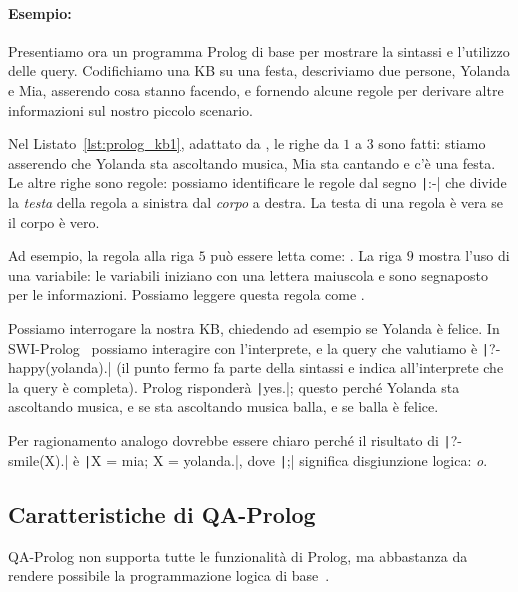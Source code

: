 \paragraph{Esempio:} Presentiamo ora un programma Prolog di base per mostrare la sintassi e l'utilizzo delle query. Codifichiamo una KB su una festa, descriviamo due persone, Yolanda e Mia, asserendo cosa stanno facendo, e fornendo alcune regole per derivare altre informazioni sul nostro piccolo scenario.
\begin{listingenv}[h]
	\caption{KB di base}
	\label{lst:prolog_kb1}
\end{listingenv}

Nel Listato~\ref{lst:prolog_kb1}, adattato da \cite{learn_prolog_now_online}, le righe da $1$ a $3$ sono fatti: stiamo asserendo che Yolanda sta ascoltando musica, Mia sta cantando e c'è una festa. Le altre righe sono regole: possiamo identificare le regole dal segno \texttt|:-| che divide la \emph{testa} della regola a sinistra dal \emph{corpo} a destra. La testa di una regola è vera se il corpo è vero.

Ad esempio, la regola alla riga $5$ può essere letta come: . La riga $9$ mostra l'uso di una variabile: le variabili iniziano con una lettera maiuscola e sono segnaposto per le informazioni. Possiamo leggere questa regola come .

Possiamo interrogare la nostra KB, chiedendo ad esempio se Yolanda è felice. In SWI-Prolog~\cite{wielemaker2011tplp} possiamo interagire con l'interprete, e la query che valutiamo è \texttt|?- happy(yolanda).| (il punto fermo fa parte della sintassi e indica all'interprete che la query è completa). Prolog risponderà \texttt|yes.|; questo perché Yolanda sta ascoltando musica, e se sta ascoltando musica balla, e se balla è felice.

Per ragionamento analogo dovrebbe essere chiaro perché il risultato di \texttt|?- smile(X).| è \texttt|X = mia; X = yolanda.|, dove \texttt|;| significa disgiunzione logica: \emph{o}.

\subsection{Caratteristiche di QA-Prolog}
\label{sec:feature_qa_p}
QA-Prolog non supporta tutte le funzionalità di Prolog, ma abbastanza da rendere possibile la programmazione logica di base~\cite{pakin2018performing}.

